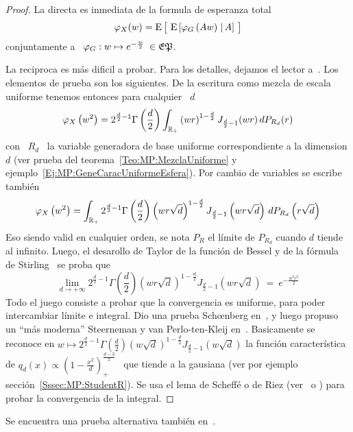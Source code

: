 \begin{proof}
  La directa es inmediata de la formula de esperanza total
  \[
  \varphi_X(w)  =  \operatorname{E}\big[ \,  \operatorname{E}\left[  \varphi_G\left( A w \right)  \left.  \right|
      A\right] \, \big]
  \]
  conjuntamente a \ $\varphi_G: w \mapsto e^{-\frac{w}{2}} \: \in \mathfrak{EP}$.

  La reciproca es  m\'as dificil a probar. Para los  detalles, dejamos el lector
  a~\cite{Sch38}. Los  elementos de prueba  son los siguientes. De  la escritura
  como mezcla de escala uniforme tenemos entonces para cualquier \ $d$
  \[
  \varphi_X\left(  w^2  \right)   =  2^{\frac{d}{2}-1}  \Gamma\left(  \frac{d}{2}
  \right) \int_{\mathbb{R}_+} \left(  w r \right)^{1-\frac{d}{2}} J_{\frac{d}{2}-1}(w
  r) \, dP_{R_d}(r)
  \]
  con \  $R_d$ \ la  variable generadora de  base uniforme correspondiente  a la
  dimension   $d$   (ver   prueba  del   teorema~\ref{Teo:MP:MezclaUniforme}   y
  ejemplo~\ref{Ej:MP:GeneCaracUniformeEsfera}).  Por   cambio  de  variables  se
  escribe tambi\'en
  \[
  \varphi_X\left(  w^2 \right)  = \int_{\mathbb{R}_+}  2^{\frac{d}{2}-1} \Gamma\left(
    \frac{d}{2}   \right)   \left(    w   r   \sqrt{d}   \right)^{1-\frac{d}{2}}
  J_{\frac{d}{2}-1}\left(  w r  \sqrt{d}  \right) \,  dP_{R_d}\left( r  \sqrt{d}
  \right)
  \]
  Eso siendo  valid en cualquier orden,  se nota $P_R$ el  l\'imite de $P_{R_d}$
  cuando $d$ tiende al infinito.  Luego,  el desarollo de Taylor de la funci\'on
  de Bessel  y de  la f\'ormula de  Stirling~\cite[Ec.~8.402~y~8.327]{GraRyz} se
  proba que
  \[
  \lim_{d \to +\infty} 2^{\frac{d}{2}-1} \Gamma\left( \frac{d}{2} \right) \left(
    w  r \sqrt{d} \right)^{1-\frac{d}{2}}  J_{\frac{d}{2}-1}\left( w  r \sqrt{d}
  \right) \: = \: e^{-\frac{w^2 r^2}{2}}
  \]
  Todo el  juego consiste a probar  que la convergencia es  uniforme, para poder
  intercambiar   l\'imite   e    integral.    Dio   una   prueba   Sch{\oe}nberg
  en~\cite{Sch38},  y  luego  propuso  un  ``m\'as moderna''  Steerneman  y  van
  Perlo-ten-Kleij  en~\cite{SteVan05}.  Basicamente  se reconoce  en  $w \mapsto
  2^{\frac{d}{2}-1}   \Gamma\left(  \frac{d}{2}   \right)   \left(  w   \sqrt{d}
  \right)^{1-\frac{d}{2}}   J_{\frac{d}{2}-1}\left(  w   \sqrt{d}   \right)$  la
  funci\'on  caracter\'istica  de  $q_d(x)  \propto  \left(  1  -  \frac{x^2}{d}
  \right)_+^{\frac{d-3}{2}}$  \  que  tiende  a  la gausiana  (ver  por  ejemplo
  secci\'on~\ref{Sssec:MP:StudentR}).   Se usa el  lema de  Scheff\'e o  de Riez
  (ver~\cite{Rie28,  Sch47, Nov72,  Kus10} o  \cite{AthLah06,  Bog07:v1, Bil12})
  para probar la convergencia de la integral.
\end{proof}
%
\noindent Se encuentra una prueba alternativa tambi\'en en~\cite{FanKot90, Kin72}.

